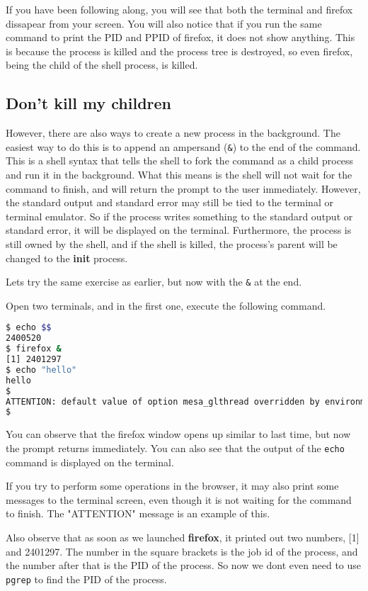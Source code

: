 If you have been following along, you will see that both the terminal and firefox
dissapear from your screen. You will also notice that if you run the same
command to print the PID and PPID of firefox, it does not show anything.
This is because the process is killed and the process tree is destroyed, so
even firefox, being the child of the shell process, is killed.

\subsection{Don't kill my children}

However, there are also ways to create a new process in the background.
The easiest way to do this is to append an ampersand (\texttt{\&}) to the
end of the command. This is a shell syntax that tells the shell to fork the
command as a child process and run it in the background. What this means is
the shell will not wait for the command to finish, and will return the prompt
to the user immediately. However, the standard output and standard error may
still be tied to the terminal or terminal emulator. So if the process writes
something to the standard output or standard error, it will be displayed on the
terminal. Furthermore, the process is still owned by the shell, and if the shell
is killed, the process's parent will be changed to the \textbf{init} process.

Lets try the same exercise as earlier, but now with the \texttt{\&} at the end.

Open two terminals, and in the first one, execute the following command.

\begin{lstlisting}[language=bash]
$ echo $$
2400520
$ firefox &
[1] 2401297
$ echo "hello"
hello
$
ATTENTION: default value of option mesa_glthread overridden by environment.
$
\end{lstlisting}

You can observe that the firefox window opens up similar to last time, but
now the prompt returns immediately. You can also see that the output of the
\texttt{echo} command is displayed on the terminal.

If you try to perform some operations in the browser, it may also print
some messages to the terminal screen, even though it is not waiting for
the command to finish. The "ATTENTION" message is an example of this.

Also observe that as soon as we launched \textbf{firefox}, it printed out
two numbers, [1] and 2401297. The number in the square brackets is the job
id of the process, and the number after that is the PID of the process.
So now we dont even need to use \texttt{pgrep} to find the PID of the process.


